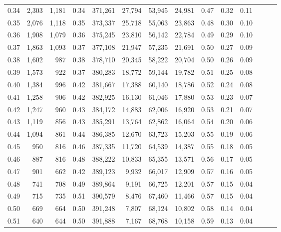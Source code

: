 \begin{tabular}{rrrrrrrrrrrrrr}
0.34 &   2,303 &  1,181 &  0.34 &  371,261 &   27,794 &  53,945 &  24,981 &  0.47 &  0.32 &      0.11 \\
0.35 &   2,076 &  1,118 &  0.35 &  373,337 &   25,718 &  55,063 &  23,863 &  0.48 &  0.30 &      0.10 \\
0.36 &   1,908 &  1,079 &  0.36 &  375,245 &   23,810 &  56,142 &  22,784 &  0.49 &  0.29 &      0.10 \\
0.37 &   1,863 &  1,093 &  0.37 &  377,108 &   21,947 &  57,235 &  21,691 &  0.50 &  0.27 &      0.09 \\
0.38 &   1,602 &    987 &  0.38 &  378,710 &   20,345 &  58,222 &  20,704 &  0.50 &  0.26 &      0.09 \\
0.39 &   1,573 &    922 &  0.37 &  380,283 &   18,772 &  59,144 &  19,782 &  0.51 &  0.25 &      0.08 \\
0.40 &   1,384 &    996 &  0.42 &  381,667 &   17,388 &  60,140 &  18,786 &  0.52 &  0.24 &      0.08 \\
0.41 &   1,258 &    906 &  0.42 &  382,925 &   16,130 &  61,046 &  17,880 &  0.53 &  0.23 &      0.07 \\
0.42 &   1,247 &    960 &  0.43 &  384,172 &   14,883 &  62,006 &  16,920 &  0.53 &  0.21 &      0.07 \\
0.43 &   1,119 &    856 &  0.43 &  385,291 &   13,764 &  62,862 &  16,064 &  0.54 &  0.20 &      0.06 \\
0.44 &   1,094 &    861 &  0.44 &  386,385 &   12,670 &  63,723 &  15,203 &  0.55 &  0.19 &      0.06 \\
0.45 &     950 &    816 &  0.46 &  387,335 &   11,720 &  64,539 &  14,387 &  0.55 &  0.18 &      0.05 \\
0.46 &     887 &    816 &  0.48 &  388,222 &   10,833 &  65,355 &  13,571 &  0.56 &  0.17 &      0.05 \\
0.47 &     901 &    662 &  0.42 &  389,123 &    9,932 &  66,017 &  12,909 &  0.57 &  0.16 &      0.05 \\
0.48 &     741 &    708 &  0.49 &  389,864 &    9,191 &  66,725 &  12,201 &  0.57 &  0.15 &      0.04 \\
0.49 &     715 &    735 &  0.51 &  390,579 &    8,476 &  67,460 &  11,466 &  0.57 &  0.15 &      0.04 \\
0.50 &     669 &    664 &  0.50 &  391,248 &    7,807 &  68,124 &  10,802 &  0.58 &  0.14 &      0.04 \\
0.51 &     640 &    644 &  0.50 &  391,888 &    7,167 &  68,768 &  10,158 &  0.59 &  0.13 &      0.04 \\

\end{tabular}
